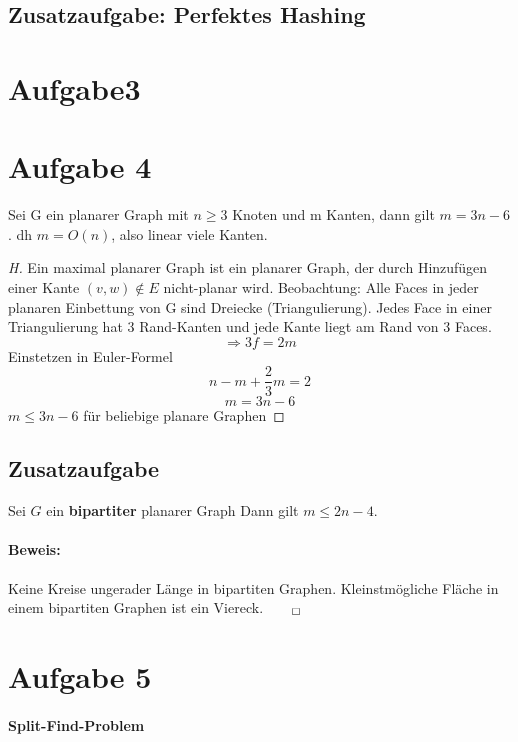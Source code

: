 \documentclass[10pt,a4paper]{article}
\begin{document}
\subsection*{Zusatzaufgabe: Perfektes Hashing}

\section*{Aufgabe3}


\section*{Aufgabe 4}
	Sei G ein planarer Graph mit $ n \geq 3 $ Knoten und m Kanten, dann gilt $ m = 3n-6 $. dh $ m=O(n) $, also linear viele Kanten.
	\begin{proof}[H]
		Ein maximal planarer Graph ist ein planarer Graph, der durch Hinzufügen einer Kante $ (v,w) \notin E $ nicht-planar wird. Beobachtung: Alle Faces in jeder planaren Einbettung von G sind Dreiecke (Triangulierung). Jedes Face in einer Triangulierung hat 3 Rand-Kanten und jede Kante liegt am Rand von 3 Faces. 
		$$\Rightarrow 3f = 2m $$
		Einstetzen in Euler-Formel
		$$ n - m + \frac{2}{3}m = 2$$
		$$ m = 3n-6$$
		$ m \leq 3n-6 $ für beliebige planare Graphen
	\end{proof}

\subsection*{Zusatzaufgabe}
Sei $G$ ein \textbf{bipartiter} planarer Graph Dann gilt $ m \leq 2n-4 $. 

\paragraph{Beweis:} Keine Kreise ungerader Länge in bipartiten Graphen. Kleinstmögliche Fläche in einem bipartiten Graphen ist ein Viereck.$_{\qed}$


\section*{Aufgabe 5}
\paragraph{Split-Find-Problem}
\end{document}
